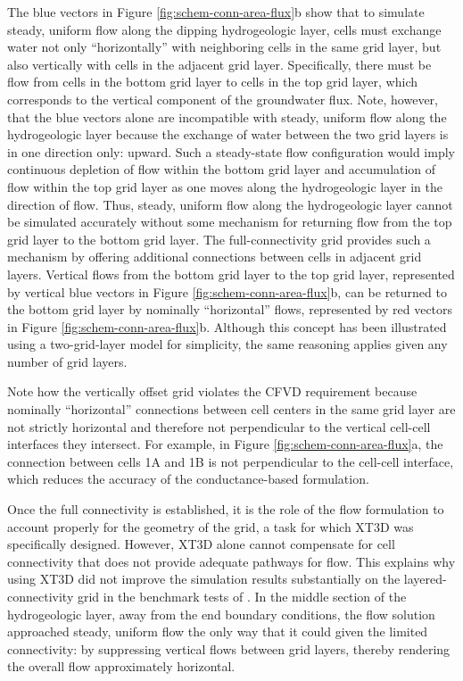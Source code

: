 \documentclass{article}
\begin{document}
The blue vectors in Figure \ref{fig:schem-conn-area-flux}b show that to simulate steady, uniform flow along the dipping hydrogeologic layer, cells must exchange water not only ``horizontally'' with neighboring cells in the same grid layer, but also vertically with cells in the adjacent grid layer. Specifically, there must be flow from cells in the bottom grid layer to cells in the top grid layer, which corresponds to the vertical component of the groundwater flux. Note, however, that the blue vectors alone are incompatible with steady, uniform flow along the hydrogeologic layer because the exchange of water between the two grid layers is in one direction only: upward. Such a steady-state flow configuration would imply continuous depletion of flow within the bottom grid layer and accumulation of flow within the top grid layer as one moves along the hydrogeologic layer in the direction of flow. Thus, steady, uniform flow along the hydrogeologic layer cannot be simulated accurately without some mechanism for returning flow from the top grid layer to the bottom grid layer. The full-connectivity grid provides such a mechanism by offering additional connections between cells in adjacent grid layers. Vertical flows from the bottom grid layer to the top grid layer, represented by vertical blue vectors in Figure \ref{fig:schem-conn-area-flux}b, can be returned to the bottom grid layer by nominally ``horizontal'' flows, represented by red vectors in Figure \ref{fig:schem-conn-area-flux}b. Although this concept has been illustrated using a two-grid-layer model for simplicity, the same reasoning applies given any number of grid layers.

Note how the vertically offset grid violates the CFVD requirement because nominally ``horizontal'' connections between cell centers in the same grid layer are not strictly horizontal and therefore not perpendicular to the vertical cell-cell interfaces they intersect. For example, in Figure \ref{fig:schem-conn-area-flux}a, the connection between cells 1A and 1B is not perpendicular to the cell-cell interface, which reduces the accuracy of the conductance-based formulation.

Once the full connectivity is established, it is the role of the flow formulation to account properly for the geometry of the grid, a task for which XT3D was specifically designed. However, XT3D alone cannot compensate for cell connectivity that does not provide adequate pathways for flow. This explains why using XT3D did not improve the simulation results substantially on the layered-connectivity grid in the benchmark tests of \cite{bardot2023}.  In the middle section of the hydrogeologic layer, away from the end boundary conditions, the flow solution approached steady, uniform flow the only way that it could given the limited connectivity: by suppressing vertical flows between grid layers, thereby rendering the overall flow approximately horizontal.
\end{document}
